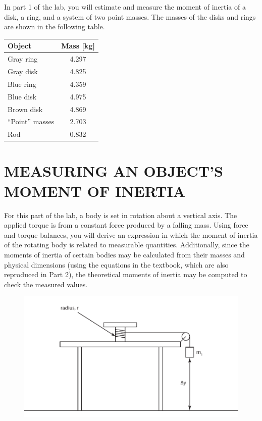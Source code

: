 \documentclass[11pt,letterpaper]{article}
\begin{document}
In part 1 of the lab, you will estimate and measure the moment of inertia of a disk, a ring, and a system of two point masses. The masses of the disks and rings are shown in the following table.
\begin{table}[h]
\begin{tabular}{|l|c|}
\hline
Object & Mass [kg]\\
\hline
Gray ring & 4.297\\
Gray disk & 4.825\\
Blue ring & 4.359\\
Blue disk & 4.975\\
Brown disk & 4.869\\
``Point'' masses & 2.703\\
Rod & 0.832\\
\hline
\end{tabular}
\end{table}

\section{MEASURING AN OBJECT'S MOMENT OF INERTIA}
For this part of the lab, a body is set in rotation about a vertical axis.  The applied
torque is from a constant force produced by a falling mass. Using force and torque balances, you will derive an expression in which the moment of inertia of the rotating body is related to measurable quantities. Additionally, since the moments of inertia of certain bodies may be calculated from their masses and physical dimensions (using the equations in the textbook, which are also reproduced in Part 2), the theoretical moments of inertia may be computed to check the measured values.

\begin{figure}[h]
\begin{center}
\includegraphics{./rotating_drum}
\end{center}
\label{fig:schematic}
\end{figure}
\end{document}
